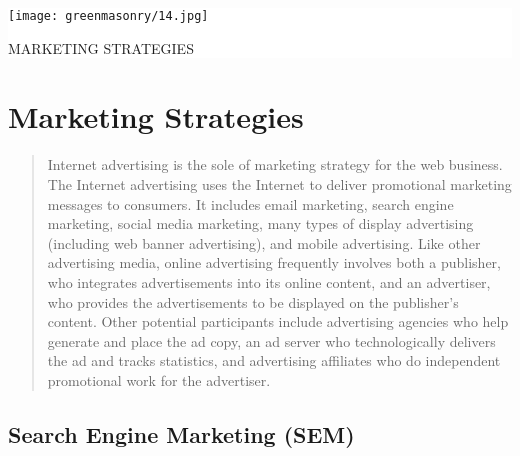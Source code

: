 \documentclass[35pt]{report}
\begin{document}

\thispagestyle{empty}

\vspace*{2cm}
\colorbox{white}{
	\parbox[t]{1.0\linewidth}{
       	\begin{center} 
			\fontsize{40pt}{11pt}\selectfont 
			\vspace*{.5cm}
				{\texttt{[image: greenmasonry/14.jpg]}}
				{MARKETING STRATEGIES\par}
			\vspace*{.5cm}
		\end{center}
	}
}


\clearpage

\normalsize

\chapter{Marketing Strategies}
\begin{quote}
Internet advertising is the sole of marketing strategy for the web business. The Internet advertising uses the Internet to deliver promotional marketing messages to consumers. It includes email marketing, search engine marketing, social media marketing, many types of display advertising (including web banner advertising), and mobile advertising. Like other advertising media, online advertising frequently involves both a publisher, who integrates advertisements into its online content, and an advertiser, who provides the advertisements to be displayed on the publisher's content. Other potential participants include advertising agencies who help generate and place the ad copy, an ad server who technologically delivers the ad and tracks statistics, and advertising affiliates who do independent promotional work for the advertiser.
\end{quote}		
			
		\section{Search Engine Marketing (SEM)}
\end{document}
